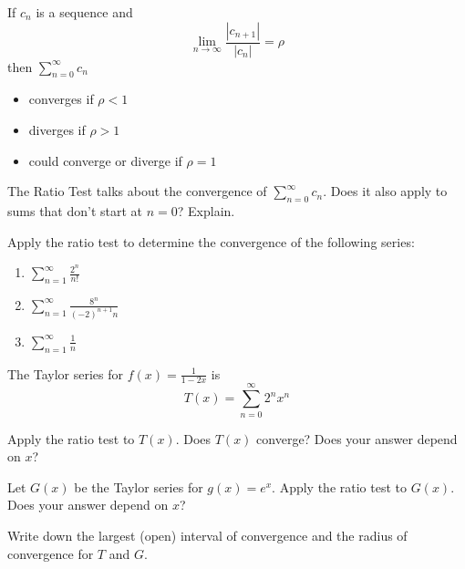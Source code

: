 \documentclass{workbook}
\begin{document}
\begin{slide}
	\question
	\begin{theorem}
		If $c_n$ is a sequence and
		\[
			\lim_{n\to\infty} \frac{|c_{n+1}|}{|c_n|} =\rho
		\]
		then $\displaystyle \sum_{n=0}^\infty c_n$

		\begin{itemize}
			\item converges if $\rho < 1$
			\item diverges if $\rho > 1$
			\item could converge or diverge if $\rho =1$
		\end{itemize}
	\end{theorem}

	\begin{parts}
		\item
		\begin{minipage}[t]{0.45\textwidth}
			The Ratio Test talks about the convergence of $\displaystyle \sum_{n=0}^\infty c_n$.
			Does it also apply to sums that don't start at $n=0$? Explain.
		\end{minipage}
		\item Apply the ratio test to determine the convergence of the
		following series:
		\begin{enumerate}
			\item $\displaystyle \sum_{n=1}^\infty \frac{2^{n}}{n!}$
			\item $\displaystyle \sum_{n=1}^\infty \frac{8^n}{(-2)^{n+1}n}$
			\item $\displaystyle \sum_{n=1}^\infty \frac{1}{n}$
		\end{enumerate}
	\end{parts}
\end{slide}

\begin{slide}
	\question
	The Taylor series for $f(x)=\frac{1}{1-2x}$ is
	\[
		T(x)=\sum_{n=0}^\infty 2^nx^n
	\]

	\begin{parts}
		\item Apply the ratio test to $T(x)$. Does $T(x)$ converge?
		Does your answer depend on $x$?
		\item Let $G(x)$ be the Taylor series for $g(x)=e^x$. Apply the ratio
		test to $G(x)$. Does your answer depend on $x$?
		\item Write down the largest (open) interval of convergence and the radius of convergence for $T$ and $G$.
	\end{parts}
\end{slide}
\end{document}
